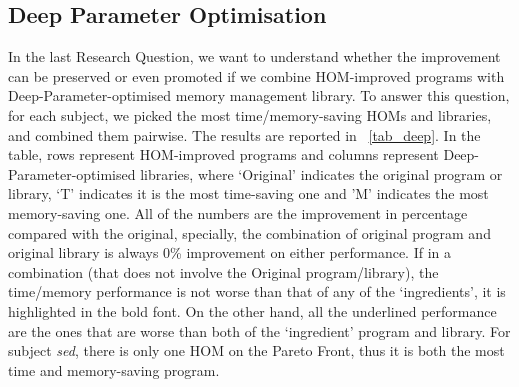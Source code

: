 \documentclass[oribibl]{llncs}
\begin{document}
\subsection{Deep Parameter Optimisation}
\label{sec_resdeep}

In the last Research Question, we want to understand whether the improvement can be preserved or even promoted if we combine HOM-improved programs with Deep-Parameter-optimised memory management library.
To answer this question, for each subject, we picked the most time/memory-saving HOMs and libraries, and combined them pairwise.
The results are reported in \tablename~\ref{tab_deep}.
In the table, rows represent HOM-improved programs and columns represent Deep-Parameter-optimised libraries, where `Original' indicates the original program or library, `T' indicates it is the most time-saving one and 'M' indicates the most memory-saving one.
All of the numbers are the improvement in percentage compared with the original, specially, the combination of original program and original library is always 0\% improvement on either performance.
If in a combination (that does not involve the Original program/library), the time/memory performance is not worse than that of any of the `ingredients', it is highlighted in the bold font.
On the other hand, all the underlined performance are the ones that are worse than both of the `ingredient' program and library.
For subject \emph{sed}, there is only one HOM on the Pareto Front, thus it is both the most time and memory-saving program.
\end{document}
